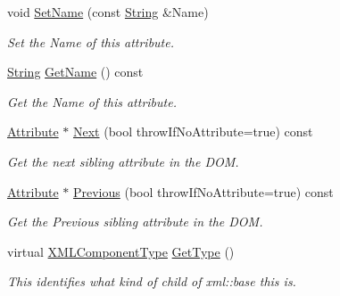 \begin{DoxyCompactItemize}
void \hyperlink{classphys_1_1xml_1_1Attribute_a9c90f6c8b6c409309fd503e1fe4a71bd}{SetName} (const \hyperlink{namespacephys_aa03900411993de7fbfec4789bc1d392e}{String} \&Name)
\begin{DoxyCompactList}\small\item\em Set the Name of this attribute. \item\end{DoxyCompactList}\item 
\hyperlink{namespacephys_aa03900411993de7fbfec4789bc1d392e}{String} \hyperlink{classphys_1_1xml_1_1Attribute_a30314ef60f51e5e161ee4d9e2b6fbd6c}{GetName} () const 
\begin{DoxyCompactList}\small\item\em Get the Name of this attribute. \item\end{DoxyCompactList}\item 
\hyperlink{classphys_1_1xml_1_1Attribute}{Attribute} $\ast$ \hyperlink{classphys_1_1xml_1_1Attribute_aadf4930c5c1cd8aa140bea3c05253446}{Next} (bool throwIfNoAttribute=true) const 
\begin{DoxyCompactList}\small\item\em Get the next sibling attribute in the DOM. \item\end{DoxyCompactList}\item 
\hyperlink{classphys_1_1xml_1_1Attribute}{Attribute} $\ast$ \hyperlink{classphys_1_1xml_1_1Attribute_a3c9fdaa3f88cdf90d61af77cb33e022e}{Previous} (bool throwIfNoAttribute=true) const 
\begin{DoxyCompactList}\small\item\em Get the Previous sibling attribute in the DOM. \item\end{DoxyCompactList}\item 
virtual \hyperlink{classphys_1_1xml_1_1Base_a62ba0484b5ecb502f9ae9d82d3720320}{XMLComponentType} \hyperlink{classphys_1_1xml_1_1Attribute_a58ebb56547b77dad9c8cb11eb4558cc9}{GetType} ()
\begin{DoxyCompactList}\small\item\em This identifies what kind of child of xml::base this is. \item\end{DoxyCompactList}\end{DoxyCompactItemize}
